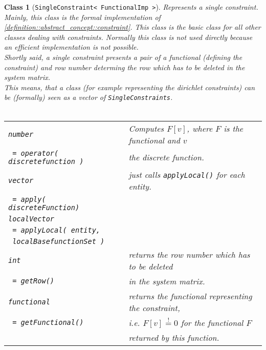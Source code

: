\documentclass[a4paper,11pt]{article}
\numberwithin{equation}{section}
\newtheorem{class}[definition]{Class}
\newcommand{\theoremEndLine}{\hspace{1mm}}
\newcommand{\CodeT}[1]{\textnormal{\texttt{#1}}}
\begin{document}
	\begin{class}[\CodeT{SingleConstraint< FunctionalImp >}]
		Represents a single constraint. Mainly, this class is the formal implementation of \ref{definition::abstract_concept::constraint}. This class is the basic class for all other classes dealing with constraints. Normally this class is not used directly because an efficient implementation is not possible.\\
		Shortly said, a single constraint presents a pair of a \emph{functional} (defining the constraint) and \emph{row number} determing the row which has to be deleted in the system matrix.\\
		This means, that a class (for example representing the dirichlet constraints) can be (formally) seen as a vector of \CodeT{SingleConstraints}.
		\\\\
      \begin{tabular}{|l|l|}
        \hline
        \CodeT{number} & Computes $F[v]$, where $F$ is the functional and $v$\\
        \CodeT{ = operator( discretefunction )} & the discrete function.\\
        \hline
				\CodeT{vector} & just calls \CodeT{applyLocal()} for each entity.\\
				\CodeT{ = apply( discreteFunction) } & \\
				\hline
        \CodeT{localVector} & \\
        \CodeT{ = applyLocal( entity,} & \\
        \CodeT{ localBasefunctionSet )}  & \\         
        \hline
				\CodeT{int} & returns the row number which has to be deleted \\
				\CodeT{ = getRow()} & in the system matrix.\\
        \hline
				\CodeT{functional} & returns the functional representing the constraint,\\
				\CodeT{ = getFunctional()} & i.e. $F[v]\stackrel{!}{=}0$ for the functional $F$\\
				  & returned by this function.\\
				\hline
      \end{tabular}
    \end{class}\theoremEndLine
\end{document}
